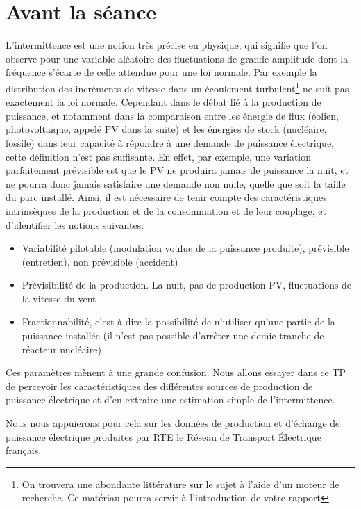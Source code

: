\documentclass[12pt,a4,french]{article}
\begin{document}
\part{Avant la séance}
\label{sec:avant}
L'intermittence est une notion très précise en physique, qui signifie que
l'on observe pour une variable aléatoire des fluctuations de grande amplitude dont la fréquence s'écarte de celle attendue pour une loi normale. Par exemple la distribution des incréments de vitesse dans un écoulement turbulent\footnote{On trouvera une abondante littérature sur le sujet à l'aide d'un moteur de recherche. Ce matériau pourra servir à l'introduction de votre rapport} ne suit pas exactement la loi normale.
Cependant dans le débat lié à
la production de puissance, et notamment dans la comparaison entre les
énergie de flux (éolien, photovoltaïque, appelé PV dans la suite) et les énergies de stock (nucléaire,
fossile) dans leur capacité à répondre à une demande de puissance
électrique, cette définition n'est pas suffisante. En effet, par exemple,
une variation parfaitement prévisible est que le PV ne produira jamais de
puissance la nuit, et ne pourra donc jamais satisfaire une demande non nulle, quelle que
soit la taille du parc installé. Ainsi, il est nécessaire de tenir compte
des caractéristiques intrinsèques de la production et de la consommation et
de leur couplage, et d'identifier les notions suivantes:
\begin{itemize}
  \item Variabilité pilotable (modulation voulue de la puissance produite), prévisible (entretien), non prévisible (accident)
  
  \item Prévisibilité de la production. La nuit, pas de production PV, fluctuations de la vitesse du vent
  
  \item Fractionnabilité, c'est à dire la possibilité de n'utiliser qu'une
  partie de la puissance installée (il n'est pas possible d'arrêter une demie tranche de réacteur nucléaire)  
\end{itemize}
Ces paramètres mènent à une grande confusion. Nous allons essayer dans ce
TP de percevoir les caractéristiques des différentes sources de production
de puissance électrique et d'en extraire une estimation simple de
l'intermittence.

Nous nous appuierons pour cela sur les données de production et d'échange de puissance électrique produites par RTE le Réseau de Transport Électrique français.
\end{document}
